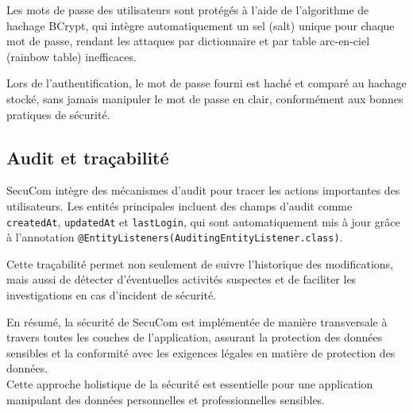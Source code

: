 Les mots de passe des utilisateurs sont protégés à l'aide de l'algorithme de hachage BCrypt, qui intègre automatiquement un sel (salt) unique pour chaque mot de passe, rendant les attaques par dictionnaire et par table arc-en-ciel (rainbow table) inefficaces.

\vspace{0.5cm}

\begin{note}
Lors de l'authentification, le mot de passe fourni est haché et comparé au hachage stocké, sans jamais manipuler le mot de passe en clair, conformément aux bonnes pratiques de sécurité.
\end{note}

\subsection{Audit et traçabilité}

SecuCom intègre des mécanismes d'audit pour tracer les actions importantes des utilisateurs. Les entités principales incluent des champs d'audit comme \texttt{createdAt}, \texttt{updatedAt} et \texttt{lastLogin}, qui sont automatiquement mis à jour grâce à l'annotation \texttt{@EntityListeners(AuditingEntityListener.class)}.

\vspace{0.5cm}

Cette traçabilité permet non seulement de suivre l'historique des modifications, mais aussi de détecter d'éventuelles activités suspectes et de faciliter les investigations en cas d'incident de sécurité.

\vspace{1cm}

\begin{tcolorbox}[
  title={\textbf{Sécurité transversale}},
  colback=blue!5!white,
  colframe=primarycolor,
  fonttitle=\bfseries,
  boxrule=0.5mm,
  arc=2mm,
  left=6mm,
  right=6mm,
  top=6mm,
  bottom=6mm
]
En résumé, la sécurité de SecuCom est implémentée de manière transversale à travers toutes les couches de l'application, assurant la protection des données sensibles et la conformité avec les exigences légales en matière de protection des données.\\ 
Cette approche holistique de la sécurité est essentielle pour une application manipulant des données personnelles et professionnelles sensibles.
\end{tcolorbox}
